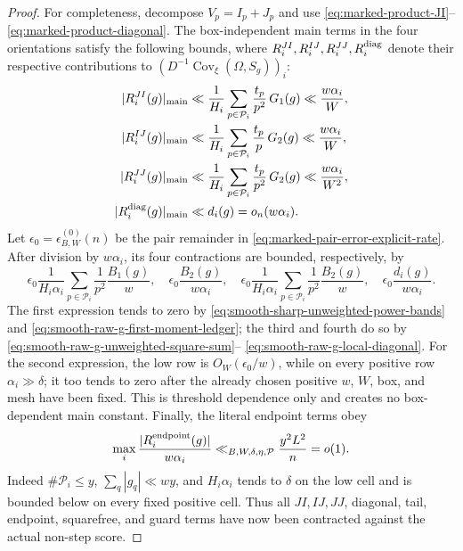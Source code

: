 \documentclass[11pt]{article}
\numberwithin{equation}{section}
\theoremstyle{definition}
\theoremstyle{remark}
\newcommand{\1}{\mathbf 1}
\begin{document}
\begin{proof}
For completeness, decompose \(V_p=I_p+J_p\) and use
\eqref{eq:marked-product-JI}--
\eqref{eq:marked-product-diagonal}.  The box-independent main terms in
the four orientations satisfy the following bounds, where
\(R_i^{JI},R_i^{IJ},R_i^{JJ},R_i^{\rm diag}\) denote their respective
contributions to
\((D^{-1}\operatorname{Cov}_\xi(\Omega,S_g))_i\):
\begin{align}
 |R_i^{JI}(g)|_{\rm main}
 &\ll \frac1{H_i}\sum_{p\in\mathcal P_i}\frac{t_p}{p^2}\,G_1(g)
      \ll\frac{w\alpha_i}{W},\notag\\
 |R_i^{IJ}(g)|_{\rm main}
 &\ll \frac1{H_i}\sum_{p\in\mathcal P_i}\frac{t_p}{p}\,G_2(g)
      \ll\frac{w\alpha_i}{W},\notag\\
 |R_i^{JJ}(g)|_{\rm main}
 &\ll \frac1{H_i}\sum_{p\in\mathcal P_i}\frac{t_p}{p^2}\,G_2(g)
      \ll\frac{w\alpha_i}{W^2},\notag\\
 |R_i^{\rm diag}(g)|_{\rm main}
 &\ll d_i(g)=o_n(w\alpha_i).
 \label{eq:smooth-raw-g-four-power-main-directions}
\end{align}
Let \(\epsilon_0=\epsilon^{(0)}_{B,W}(n)\) be the pair remainder in
\eqref{eq:marked-pair-error-explicit-rate}.  After division by
\(w\alpha_i\), its four contractions are bounded, respectively, by
\begin{equation}
 \epsilon_0\frac1{H_i\alpha_i}
       \sum_{p\in\mathcal P_i}\frac1{p^2}\frac{B_1(g)}w,
 \quad
 \epsilon_0\frac{B_2(g)}{w\alpha_i},
 \quad
 \epsilon_0\frac1{H_i\alpha_i}
       \sum_{p\in\mathcal P_i}\frac1{p^2}\frac{B_2(g)}w,
 \quad
 \epsilon_0\frac{d_i(g)}{w\alpha_i}.
 \label{eq:smooth-raw-g-four-power-error-directions}
\end{equation}
The first expression tends to zero by
\eqref{eq:smooth-sharp-unweighted-power-bands} and
\eqref{eq:smooth-raw-g-first-moment-ledger}; the third and fourth do so
by \eqref{eq:smooth-raw-g-unweighted-square-sum}--
\eqref{eq:smooth-raw-g-local-diagonal}.  For the second expression, the
low row is \(O_W(\epsilon_0/w)\), while on every positive row
\(\alpha_i\gg\delta\); it too tends to zero after the already chosen
positive \(w\), \(W\), box, and mesh have been fixed.  This is threshold
dependence only and creates no box-dependent main constant.  Finally,
the literal endpoint terms obey
\begin{equation}
 \max_i\frac{|R_i^{\rm endpoint}(g)|}{w\alpha_i}
 \ll_{B,W,\delta,\eta,\mathcal P}\frac{y^2L^2}{n}=o(1).
 \label{eq:smooth-raw-g-four-power-endpoints}
\end{equation}
Indeed \(\#\mathcal P_i\leq y\),
\(\sum_q|g_q|\ll wy\), and \(H_i\alpha_i\) tends to
\(\delta\) on the low cell and is bounded below on every fixed positive
cell.  Thus all \(JI,IJ,JJ\), diagonal, tail, endpoint, squarefree, and
guard terms have now been contracted against the actual non-step score.


\end{proof}
\end{document}
